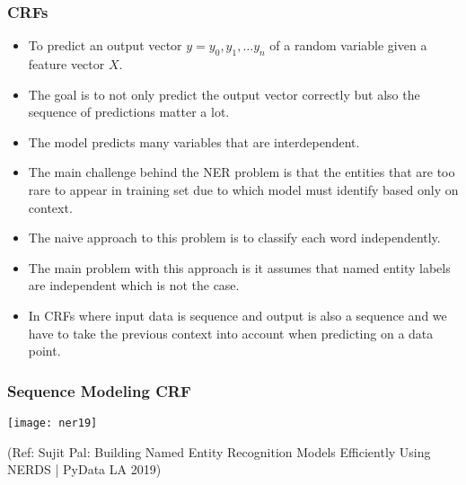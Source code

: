 


\begin{frame}[fragile]\frametitle{CRFs}
  \begin{itemize}
  \item To predict an output vector $y = {y_0, y_1, \ldots y_n}$ of a random variable given a feature vector $X$.
	\item The goal is to not only predict the output vector correctly but also the sequence of predictions matter a lot.
	\item The model predicts many variables that are interdependent.
	\item The main challenge behind the NER problem is that the entities that are too rare to appear in training set due to which model must identify based only on context. 
	\item The naive approach to this problem is to classify each word independently. 
	\item The main problem with this approach is it assumes that named entity labels are independent which is not the case.
	\item In CRFs where input data is sequence and output is also a sequence and we have to take the previous context into account when predicting on a data point.
  \end{itemize}
	

\end{frame}


\begin{frame}[fragile]\frametitle{Sequence Modeling  CRF}

\begin{center}
\texttt{[image: ner19]}
\end{center}

{\tiny (Ref: Sujit Pal: Building Named Entity Recognition Models Efficiently Using NERDS | PyData LA 2019)}

\end{frame}



